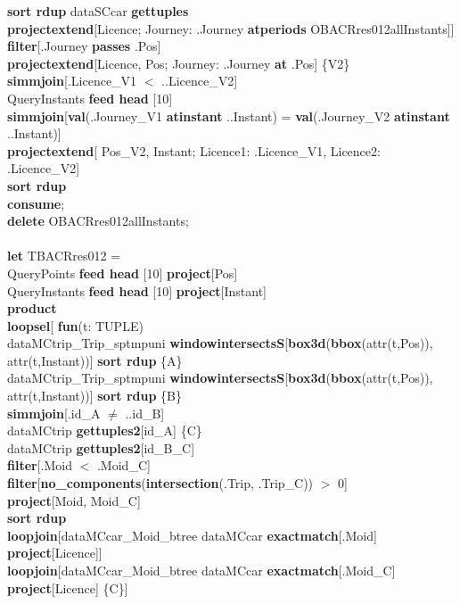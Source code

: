 \documentclass[a4paper]{article}
\newcommand{\op}[1]{\textbf{#1}}
\begin{document}
\begin{scriptsize}
\begin{tabbing}
\>\>\>\op{sort rdup} dataSCcar \op{gettuples}\\
\>\>\>\op{projectextend}[Licence; Journey: .Journey \op{atperiods} OBACRres012allInstants]]\\
\>\>\op{filter}[.Journey \op{passes} .Pos]\\
\>\>\op{projectextend}[Licence, Pos; Journey: .Journey \op{at} .Pos] \{V2\}\\
\>\op{simmjoin}[.Licence\_V1 $<$ ..Licence\_V2]\\
\>QueryInstants \op{feed head} [10]\\
\>\op{simmjoin}[\op{val}(.Journey\_V1 \op{atinstant} ..Instant) = \op{val}(.Journey\_V2 \op{atinstant} ..Instant)]\\
\>\op{projectextend}[ Pos\_V2, Instant; Licence1: .Licence\_V1, Licence2: .Licence\_V2]\\
\>\op{sort rdup}\\
\op{consume};\\
\op{delete} OBACRres012allInstants;\\
\\
\op{let} TBACRres012 =\\
\>QueryPoints \op{feed head} [10] \op{project}[Pos]\\
\>QueryInstants \op{feed head} [10] \op{project}[Instant]\\
\>\op{product}\\
\>\op{loopsel}[ \op{fun}(t: TUPLE)\\
\>\>dataMCtrip\_Trip\_sptmpuni \op{windowintersectsS}[\op{box3d}(\op{bbox}(attr(t,Pos)), attr(t,Instant))] \op{sort rdup} \{A\}\\
\>\>dataMCtrip\_Trip\_sptmpuni \op{windowintersectsS}[\op{box3d}(\op{bbox}(attr(t,Pos)), attr(t,Instant))] \op{sort rdup} \{B\}\\
\>\>\op{simmjoin}[.id\_A $\neq$ ..id\_B]\\
\>\>dataMCtrip \op{gettuples2}[id\_A] \{C\}\\
\>\>dataMCtrip \op{gettuples2}[id\_B\_C]\\
\>\>\op{filter}[.Moid $<$ .Moid\_C]\\
\>\>\op{filter}[\op{no\_components}(\op{intersection}(.Trip, .Trip\_C)) $>$ 0]\\
\>\>\op{project}[Moid, Moid\_C]\\
\>\>\op{sort rdup}\\
\>\>\op{loopjoin}[dataMCcar\_Moid\_btree dataMCcar \op{exactmatch}[.Moid] \op{project}[Licence]]\\
\>\>\op{loopjoin}[dataMCcar\_Moid\_btree dataMCcar \op{exactmatch}[.Moid\_C] \op{project}[Licence] \{C\}]\\

\end{tabbing}
\end{scriptsize}
\end{document}
